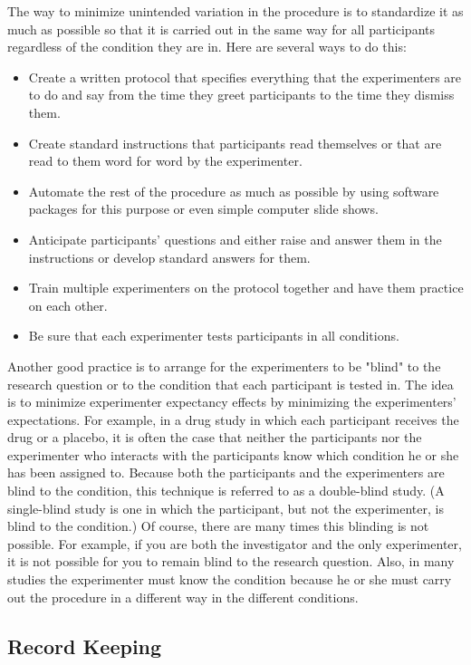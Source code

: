 The way to minimize unintended variation in the procedure is to standardize it as much as possible so that it is carried out in the same way for all participants regardless of the condition they are in. Here are several ways to do this:

\begin{itemize}
\item Create a written protocol that specifies everything that the experimenters are to do and say from the time they greet participants to the time they dismiss them.
\item Create standard instructions that participants read themselves or that are read to them word for word by the experimenter.
\item Automate the rest of the procedure as much as possible by using software packages for this purpose or even simple computer slide shows.
\item Anticipate participants' questions and either raise and answer them in the instructions or develop standard answers for them.
\item Train multiple experimenters on the protocol together and have them practice on each other.
\item Be sure that each experimenter tests participants in all conditions.
\end{itemize}

Another good practice is to arrange for the experimenters to be "blind" to the research question or to the condition that each participant is tested in. The idea is to minimize experimenter expectancy effects by minimizing the experimenters' expectations. For example, in a drug study in which each participant receives the drug or a placebo, it is often the case that neither the participants nor the experimenter who interacts with the participants know which condition he or she has been assigned to. Because both the participants and the experimenters are blind to the condition, this technique is referred to as a double-blind study. (A single-blind study is one in which the participant, but not the experimenter, is blind to the condition.) Of course, there are many times this blinding is not possible. For example, if you are both the investigator and the only experimenter, it is not possible for you to remain blind to the research question. Also, in many studies the experimenter must know the condition because he or she must carry out the procedure in a different way in the different conditions.

\subsection{Record Keeping}

